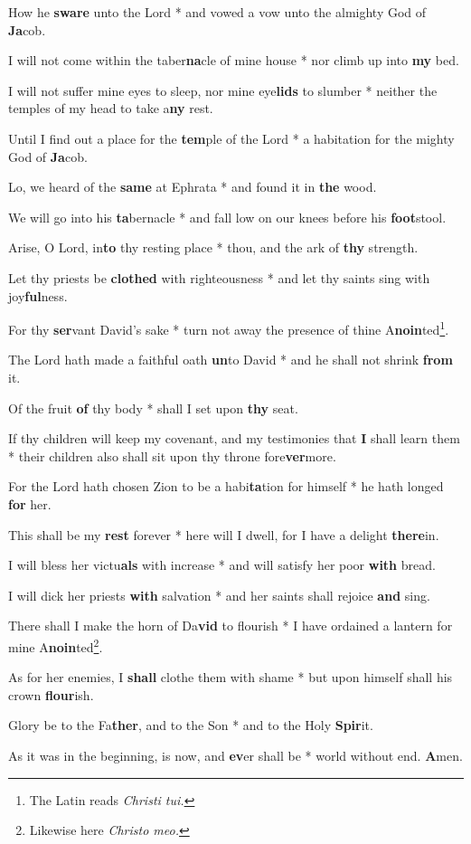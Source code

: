 \begin{multicols}{2}
	How he \textbf{sware} unto the Lord * and vowed a vow unto the almighty God of \textbf{Ja}cob.
	
	I will not come within the taber\textbf{na}cle of mine house * nor climb up into \textbf{my} bed.
	
	I will not suffer mine eyes to sleep, nor mine eye\textbf{lids} to slumber * neither the temples of my head to take a\textbf{ny} rest.
	
	Until I find out a place for the \textbf{tem}ple of the Lord * a habitation for the mighty God of \textbf{Ja}cob.
	
	Lo, we heard of the \textbf{same} at Ephrata * and found it in \textbf{the} wood.
	
	We will go into his \textbf{ta}bernacle * and fall low on our knees before his \textbf{foot}stool.
	
	Arise, O Lord, in\textbf{to} thy resting place * thou, and the ark of \textbf{thy} strength.
	
	Let thy priests be \textbf{clothed} with righteousness * and let thy saints sing with joy\textbf{ful}ness.
	
	For thy \textbf{ser}vant David's sake * turn not away the presence of thine A\textbf{noin}ted\footnote{The Latin reads \textit{Christi tui.}}.
	
	The Lord hath made a faithful oath \textbf{un}to David * and he shall not shrink \textbf{from} it.
	
	Of the fruit \textbf{of} thy body * shall I set upon \textbf{thy} seat.
	
	If thy children will keep my covenant, and my testimonies that \textbf{I} shall learn them * their children also shall sit upon thy throne fore\textbf{ver}more.
	
	For the Lord hath chosen Zion to be a habi\textbf{ta}tion for himself * he hath longed \textbf{for} her.
	
	This shall be my \textbf{rest} forever * here will I dwell, for I have a delight \textbf{there}in.
	
	I will bless her victu\textbf{als} with increase * and will satisfy her poor \textbf{with} bread.
	
	I will dick her priests \textbf{with} salvation * and her saints shall rejoice \textbf{and} sing.
	
	There shall I make the horn of Da\textbf{vid} to flourish * I have ordained a lantern for mine A\textbf{noin}ted\footnote{Likewise here \textit{Christo meo.}}.
	
	As for her enemies, I \textbf{shall} clothe them with shame * but upon himself shall his crown \textbf{flour}ish.
	
	Glory be to the Fa\textbf{ther}, and to the Son * and to the Holy \textbf{Spir}it.
	
	As it was in the beginning, is now, and \textbf{ev}er shall be * world without end. \textbf{A}men.
\end{multicols}
